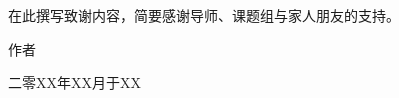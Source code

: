 {\kaishu
  \begin{center}
    \LARGE\bfseries{}
  \end{center}

  在此撰写致谢内容，简要感谢导师、课题组与家人朋友的支持。

  \vspace{1cm}
  \hfill 作者
  \par
  \hfill 二零XX年XX月于XX
}

